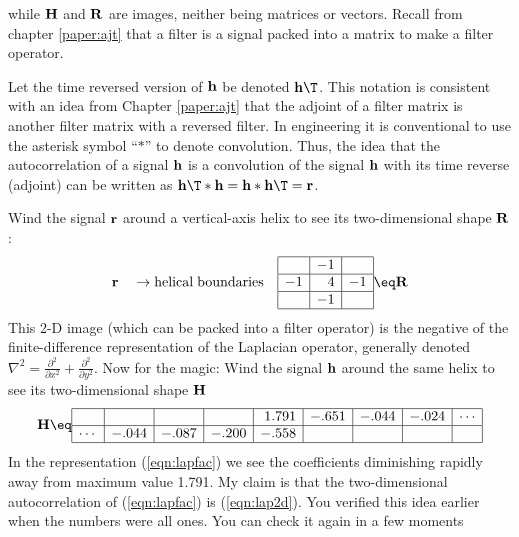 while
$\bold H$ and $\bold R$ are images,
neither being matrices or vectors.
Recall from chapter \ref{paper:ajt} that a filter is a signal
packed into a matrix to make a filter operator.
\par
Let the time reversed version of
$\bold h$
be denoted
$\bold h\T$.
This notation is consistent with an idea from
Chapter \ref{paper:ajt} that the adjoint of a filter matrix
is another filter matrix with a reversed filter.
In engineering it is conventional to use the asterisk symbol
``$\ast$'' to denote convolution.
Thus, the idea that the autocorrelation of a 
signal $\bold h$
is a convolution of the
signal $\bold h$
with its time reverse (adjoint)
can be written as
$ {\bold h}\T \ast {\bold h} = {\bold h} \ast {\bold h}\T = {\bold r}$.
\par
Wind the signal $\bold r$ around a
vertical-axis helix to see its two-dimensional shape $\bold R$:
\begin{equation}
\bold r
\quad
\rightarrow{\rm helical \; boundaries}
\quad
\begin{array}{|r|r|r|}  \hline
& -1 & \\
\hline
-1 & 4 & -1\\
\hline
& -1 & \\
\hline
\end{array}
\eq
\bold R
\label{eqn:lap2d}
\end{equation}
This 2-D image (which can be packed into a filter operator)
is the negative of the finite-difference representation
of the Laplacian operator, generally denoted
$\nabla^2 = \frac{\partial^2}{ \partial x^2} + \frac{\partial^2}{ \partial y^2} $.
Now for the magic:
Wind the signal $\bold h$ around the same helix
to see its two-dimensional shape $\bold H$
\begin{equation}
\label{eqn:lapfac}
 {\bold H}
\eq
    \begin{array} {|r|r|r|r|r|r|r|r|r|} \hline
             &      &       &       & 1.791 &  -.651 & -.044  & -.024& \cdots \\
	     \hline 
      \cdots &-.044 & -.087 & -.200 & -.558 &        &        &      &
     \\ \hline
    \end{array}
\end{equation}
In the representation (\ref{eqn:lapfac}) we see the coefficients diminishing
rapidly away from maximum value 1.791.
My claim is that the two-dimensional autocorrelation of (\ref{eqn:lapfac})
is (\ref{eqn:lap2d}).
You verified this idea earlier when the numbers were all ones.
You can check it again in a few moments
